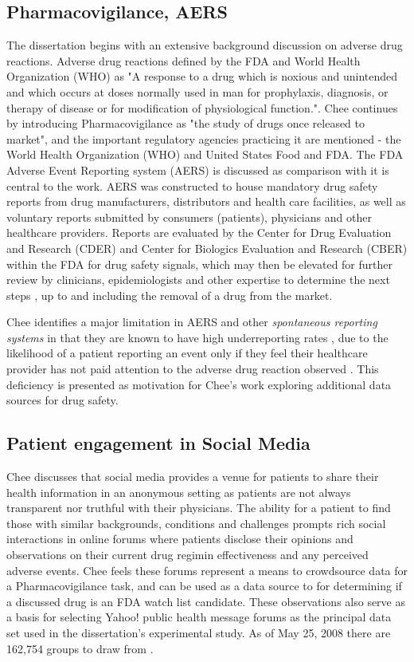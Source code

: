 \documentclass[twoside,11pt]{article}
\begin{document}
\subsection{Pharmacovigilance, AERS}
The dissertation begins with an extensive background discussion on adverse drug reactions.
Adverse drug reactions defined by the FDA and World Health Organization (WHO) as
"A response to a drug which is noxious and unintended and which occurs at doses
normally used in man for prophylaxis, diagnosis, or therapy of disease or for modification
of physiological function."\cite{FDA}. Chee continues by introducing Pharmacovigilance as
"the study of drugs once released to market", and the important regulatory
agencies practicing it are mentioned - the World Health Organization (WHO) and
United States Food and FDA. The FDA Adverse Event Reporting system (AERS)
is discussed as comparison with it is central to the work. AERS was constructed
to house mandatory drug safety reports from drug manufacturers, distributors and health
care facilities, as well as voluntary reports submitted by consumers (patients),
physicians and other healthcare providers. Reports are evaluated by the Center for
Drug Evaluation and Research (CDER) and Center for Biologics Evaluation and Research (CBER)
within the FDA for drug safety signals, which may then be elevated for further
review by clinicians, epidemiologists and other expertise to determine the next steps
, up to and including the removal of a drug from the market.

Chee identifies a major limitation in AERS and other \textit{spontaneous reporting systems}
in that they are known to have high underreporting rates \citep{Fletcher}, due
to the likelihood of a patient reporting an event only if they feel their healthcare provider
has not paid attention to the adverse drug reaction observed \citep{Leamon}. This
deficiency is presented as motivation for Chee's work exploring additional data sources
for drug safety.

\subsection{Patient engagement in Social Media}
Chee discusses that social media provides a venue for patients to share their
health information in an anonymous setting as patients are not always transparent
nor truthful with their physicians. The ability for a patient to find those with
similar backgrounds, conditions and challenges prompts rich social interactions
in online forums where patients disclose their opinions and observations on
their current drug regimin effectiveness and any perceived adverse events. Chee
feels these forums represent a means to crowdsource data for a Pharmacovigilance
task, and can be used as a data source to for determining if a discussed drug is an
FDA watch list candidate. These observations also serve as a basis for selecting
Yahoo! public health message forums as the principal data set used in the
dissertation's experimental study. As of May 25, 2008 there are 162,754 groups
to draw from \citep{Chee}.
\end{document}

